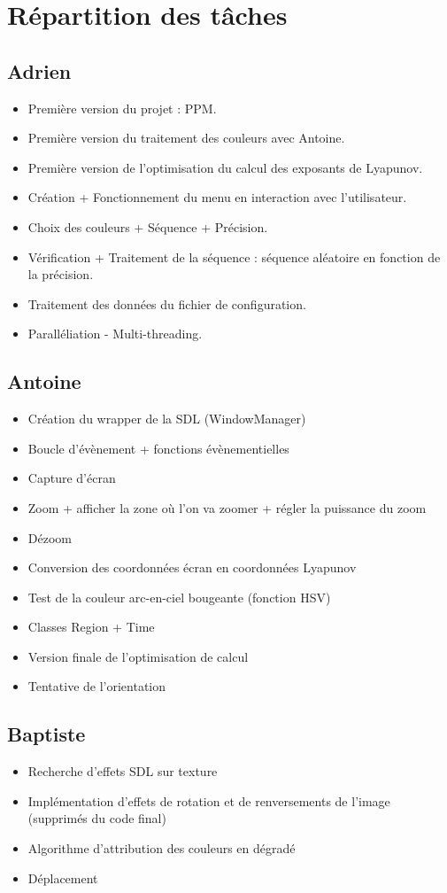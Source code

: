 \documentclass{article}
\begin{document}
	\section{Répartition des tâches}

	\subsection*{Adrien}
	\begin{itemize}
		\item Première version du projet : PPM.
		\item Première version du traitement des couleurs avec Antoine.
		\item Première version de l'optimisation du calcul des exposants de Lyapunov.
		\item Création + Fonctionnement du menu en interaction avec l'utilisateur.
		\item Choix des couleurs + Séquence + Précision.
		\item Vérification + Traitement de la séquence : séquence aléatoire en fonction de la précision.
		\item Traitement des données du fichier de configuration.
		\item Paralléliation - Multi-threading.
	\end{itemize}

	\subsection*{Antoine}

	\begin{itemize}
		\item Création du wrapper de la SDL (WindowManager)
		\item Boucle d'évènement + fonctions évènementielles
		\item Capture d'écran
		\item Zoom + afficher la zone où l'on va zoomer + régler la puissance du zoom
		\item Dézoom
		\item Conversion des coordonnées écran en coordonnées Lyapunov
		\item Test de la couleur arc-en-ciel bougeante (fonction HSV)
		\item Classes Region + Time
		\item Version finale de l'optimisation de calcul
		\item Tentative de l'orientation
	\end{itemize}

	\subsection*{Baptiste}
	
	\begin{itemize}
		\item Recherche d'effets SDL sur texture
		\item Implémentation d'effets de rotation et de renversements de l'image (supprimés du code final)
		\item Algorithme d'attribution des couleurs en dégradé
		\item Déplacement
	\end{itemize}
\end{document}
